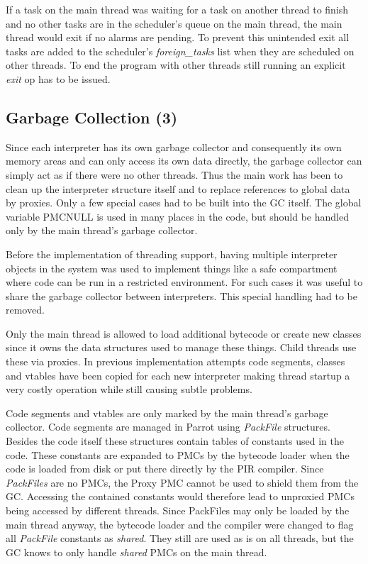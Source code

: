 \documentclass[bachelor,english]{hgbthesis}
\begin{document}
If a task on the main thread was waiting for a task on another thread to finish and no other tasks are in the scheduler's queue on the main thread, the main thread would exit if no alarms are pending. To prevent this unintended exit all tasks are added to the scheduler's \textit{foreign\_tasks} list when they are scheduled on other threads. To end the program with other threads still running an explicit \textit{exit} op has to be issued.

\subsection{Garbage Collection (3)}

Since each interpreter has its own garbage collector and consequently its own memory areas and can only access its own data directly, the garbage collector can simply act as if there were no other threads. Thus the main work has been to clean up the interpreter structure itself and to replace references to global data by proxies. Only a few special cases had to be built into the GC itself. The global variable PMCNULL is used in many places in the code, but should be handled only by the main thread's garbage collector.

Before the implementation of threading support, having multiple interpreter objects in the system was used to implement things like a safe compartment where code can be run in a restricted environment. For such cases it was useful to share the garbage collector between interpreters. This special handling had to be removed.

Only the main thread is allowed to load additional bytecode or create new classes since it owns the data structures used to manage these things. Child threads use these via proxies. In previous implementation attempts code segments, classes and vtables have been copied for each new interpreter making thread startup a very costly operation while still causing subtle problems.

Code segments and vtables are only marked by the main thread's garbage collector. Code segments are managed in Parrot using \textit{PackFile} structures. Besides the code itself these structures contain tables of constants used in the code. These constants are expanded to PMCs by the bytecode loader when the code is loaded from disk or put there directly by the PIR compiler. Since \textit{PackFiles} are no PMCs, the Proxy PMC cannot be used to shield them from the GC. Accessing the contained constants would therefore lead to unproxied PMCs being accessed by different threads. Since PackFiles may only be loaded by the main thread anyway, the bytecode loader and the compiler were changed to flag all \textit{PackFile} constants as \textit{shared}. They still are used as is on all threads, but the GC knows to only handle \textit{shared} PMCs on the main thread.
\end{document}

